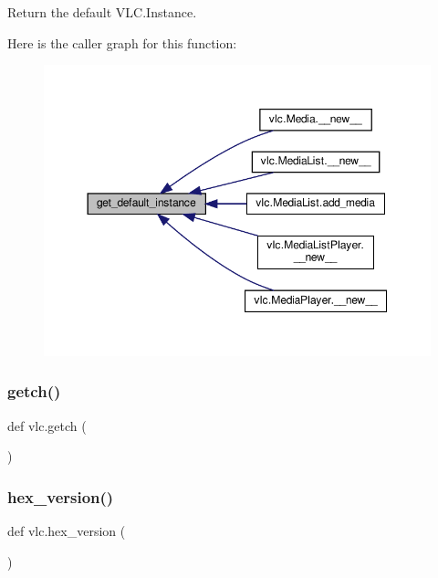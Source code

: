 \begin{DoxyVerb}Return the default VLC.Instance.
\end{DoxyVerb}
 Here is the caller graph for this function\+:
\nopagebreak
\begin{figure}[H]
\begin{center}
\leavevmode
\includegraphics[width=350pt]{namespacevlc_a3e00cfbbf5aa7ede16e3877359d8212e_icgraph}
\end{center}
\end{figure}
\mbox{\label{namespacevlc_a26c66231b8919b9ec0736a57bab415b9}} 
\subsubsection{\texorpdfstring{getch()}{getch()}}
{\footnotesize\ttfamily def vlc.\+getch (\begin{DoxyParamCaption}{ }\end{DoxyParamCaption})}

\mbox{\label{namespacevlc_a24d18f95ac8282ca98ec1740f7f6b7cc}} 
\subsubsection{\texorpdfstring{hex\+\_\+version()}{hex\_version()}}
{\footnotesize\ttfamily def vlc.\+hex\+\_\+version (\begin{DoxyParamCaption}{ }\end{DoxyParamCaption})}


